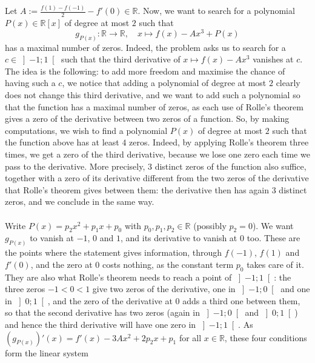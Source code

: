 \begin{solution}
    Let \( A := \frac{f\left(1\right)-f\left(-1\right)}{2}-f'\left(0\right) \in \mathbb{R} \). Now, we want to search for a polynomial \( P\left(x\right) \in \mathbb{R}\left[x\right] \) of degree at most \( 2 \) such that
    \[
        g_{P\left(x\right)} \colon \mathbb{R} \longrightarrow \mathbb{R}, \quad x \longmapsto f\left(x\right)-Ax^3+P\left(x\right)
    \]
    has a maximal number of zeros. Indeed, the problem asks us to search for a \( c \in \left]-1;1\right[ \) such that the third derivative of \( x \longmapsto f\left(x\right)-Ax^3 \) vanishes at \( c \). The idea is the following: to add more freedom and maximise the chance of having such a \( c \), we notice that adding a polynomial of degree at most \( 2 \) clearly does not change this third derivative, and we want to add such a polynomial so that the function has a maximal number of zeros, as each use of Rolle's theorem gives a zero of the derivative between two zeros of a function. So, by making computations, we wish to find a polynomial \( P\left(x\right) \) of degree at most \( 2 \) such that the function above has at least \( 4 \) zeros. Indeed, by applying Rolle's theorem three times, we get a zero of the third derivative, because we lose one zero each time we pass to the derivative. More precisely, \( 3 \) distinct zeros of the function also suffice, together with a zero of its derivative different from the two zeros of the derivative that Rolle's theorem gives between them: the derivative then has again \( 3 \) distinct zeros, and we conclude in the same way.
    \\\\
    Write \( P\left(x\right) = p_2x^2+p_1x+p_0 \) with \( p_0, p_1, p_2 \in \mathbb{R} \) (possibly \( p_2 = 0 \)). We want \( g_{P\left(x\right)} \) to vanish at \( -1 \), \( 0 \) and \( 1 \), and its derivative to vanish at \( 0 \) too. These are the points where the statement gives information, through \( f\left(-1\right) \), \( f\left(1\right) \) and \( f'\left(0\right) \), and the zero at \( 0 \) costs nothing, as the constant term \( p_0 \) takes care of it. They are also what Rolle's theorem needs to reach a point of \( \left]-1;1\right[ \): the three zeros \( -1 < 0 < 1 \) give two zeros of the derivative, one in \( \left]-1;0\right[ \) and one in \( \left]0;1\right[ \), and the zero of the derivative at \( 0 \) adds a third one between them, so that the second derivative has two zeros (again in \( \left]-1;0\right[ \) and \( \left]0;1\right[ \)) and hence the third derivative will have one zero in \( \left]-1;1\right[ \). As \( \left(g_{P\left(x\right)}\right)'\left(x\right) = f'\left(x\right)-3Ax^2+2p_2x+p_1 \) for all \( x \in \mathbb{R} \), these four conditions form the linear system

\end{solution}
